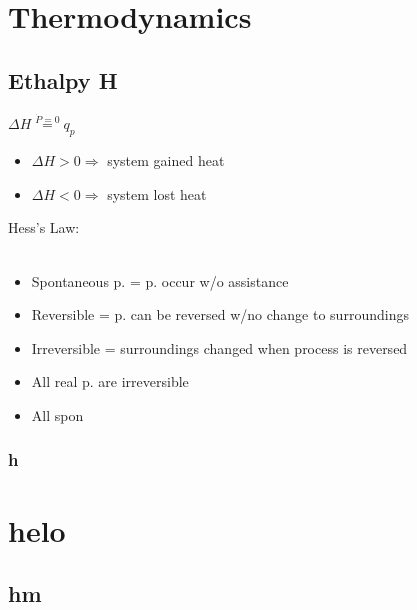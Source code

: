 \documentclass[ wastespaceontitle, english]{cheat_sheet_template}
\begin{document}
\section{Thermodynamics}
    \subsection{Ethalpy H}
    $ \Delta H  \stackrel{\dot{P}=0}{=}  q_p $
    \begin{itemize}
        \item $\Delta H > 0 \Rightarrow$ system gained heat
        \item $\Delta H < 0 \Rightarrow$ system lost heat
    \end{itemize}
    Hess's Law: \\
     \\
    \begin{itemize}
        \item Spontaneous p. = p. occur w/o assistance
        \item Reversible = p. can be reversed w/no change to surroundings
        \item Irreversible = surroundings changed when process is reversed
    \end{itemize}
    \begin{itemize}
        \item All real p. are irreversible
        \item All spon
    \end{itemize}
        \subsubsection{h}
\lipsum
\section{helo}
\subsection{hm}
\lipsum
\end{document}

